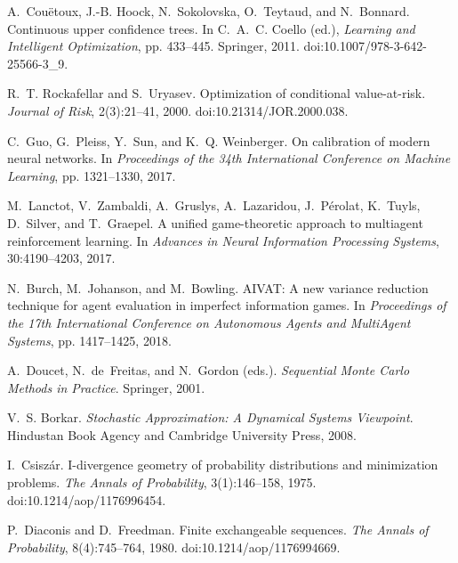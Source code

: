 \documentclass[10pt]{article}
\newcommand{\1}{\mathbf{1}}
\theoremstyle{plain}
\begin{document}
\begin{thebibliography}{99}
A.~Cou\"{e}toux, J.-B. Hoock, N.~Sokolovska, O.~Teytaud, and N.~Bonnard.
\newblock Continuous upper confidence trees.
\newblock In C.~A.~C. Coello (ed.), \emph{Learning and Intelligent Optimization}, pp. 433--445. Springer, 2011.
\newblock doi:10.1007/978-3-642-25566-3\_9.

R.~T. Rockafellar and S.~Uryasev.
\newblock Optimization of conditional value-at-risk.
\newblock \emph{Journal of Risk}, 2(3):21--41, 2000.
\newblock doi:10.21314/JOR.2000.038.

C.~Guo, G.~Pleiss, Y.~Sun, and K.~Q. Weinberger.
\newblock On calibration of modern neural networks.
\newblock In \emph{Proceedings of the 34th International Conference on Machine Learning}, pp. 1321--1330, 2017.

M.~Lanctot, V.~Zambaldi, A.~Gruslys, A.~Lazaridou, J.~P\'{e}rolat, K.~Tuyls, D.~Silver, and T.~Graepel.
\newblock A unified game-theoretic approach to multiagent reinforcement learning.
\newblock In \emph{Advances in Neural Information Processing Systems}, 30:4190--4203, 2017.

N.~Burch, M.~Johanson, and M.~Bowling.
\newblock AIVAT: A new variance reduction technique for agent evaluation in imperfect information games.
\newblock In \emph{Proceedings of the 17th International Conference on Autonomous Agents and MultiAgent Systems}, pp. 1417--1425, 2018.

A.~Doucet, N.~de~Freitas, and N.~Gordon (eds.).
\newblock \emph{Sequential Monte Carlo Methods in Practice}.
\newblock Springer, 2001.

V.~S. Borkar.
\newblock \emph{Stochastic Approximation: A Dynamical Systems Viewpoint}.
\newblock Hindustan Book Agency and Cambridge University Press, 2008.

I.~Csisz\'{a}r.
\newblock I-divergence geometry of probability distributions and minimization problems.
\newblock \emph{The Annals of Probability}, 3(1):146--158, 1975.
\newblock doi:10.1214/aop/1176996454.

P.~Diaconis and D.~Freedman.
\newblock Finite exchangeable sequences.
\newblock \emph{The Annals of Probability}, 8(4):745--764, 1980.
\newblock doi:10.1214/aop/1176994669.


\end{thebibliography}
\end{document}
